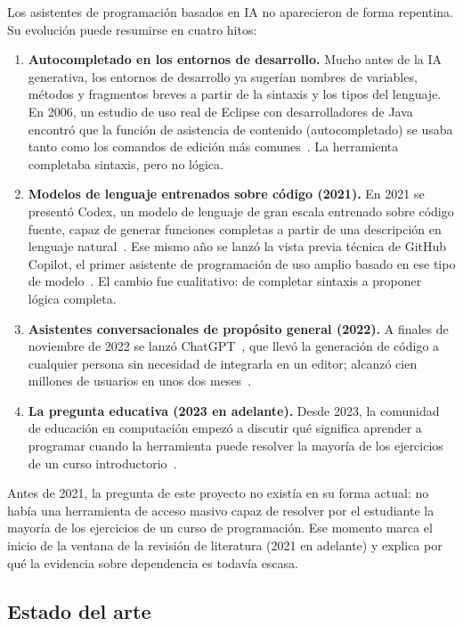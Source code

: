 \documentclass[12pt,letterpaper]{article}
\numberwithin{table}{section}
\numberwithin{figure}{section}
\begin{document}
Los asistentes de programación basados en IA no aparecieron de forma repentina. Su evolución puede resumirse en cuatro hitos:

\begin{enumerate}
  \item \textbf{Autocompletado en los entornos de desarrollo.} Mucho antes de la IA generativa, los entornos de desarrollo ya sugerían nombres de variables, métodos y fragmentos breves a partir de la sintaxis y los tipos del lenguaje. En 2006, un estudio de uso real de Eclipse con desarrolladores de Java encontró que la función de asistencia de contenido (autocompletado) se usaba tanto como los comandos de edición más comunes~\cite{murphy2006eclipse}. La herramienta completaba sintaxis, pero no lógica.
  \item \textbf{Modelos de lenguaje entrenados sobre código (2021).} En 2021 se presentó Codex, un modelo de lenguaje de gran escala entrenado sobre código fuente, capaz de generar funciones completas a partir de una descripción en lenguaje natural~\cite{chen2021evaluating}. Ese mismo año se lanzó la vista previa técnica de GitHub Copilot, el primer asistente de programación de uso amplio basado en ese tipo de modelo~\cite{friedman2021copilot}. El cambio fue cualitativo: de completar sintaxis a proponer lógica completa.
  \item \textbf{Asistentes conversacionales de propósito general (2022).} A finales de noviembre de 2022 se lanzó ChatGPT~\cite{openai2022chatgpt}, que llevó la generación de código a cualquier persona sin necesidad de integrarla en un editor; alcanzó cien millones de usuarios en unos dos meses~\cite{zhang2024dependency}.
  \item \textbf{La pregunta educativa (2023 en adelante).} Desde 2023, la comunidad de educación en computación empezó a discutir qué significa aprender a programar cuando la herramienta puede resolver la mayoría de los ejercicios de un curso introductorio~\cite{becker2023programming}.
\end{enumerate}

Antes de 2021, la pregunta de este proyecto no existía en su forma actual: no había una herramienta de acceso masivo capaz de resolver por el estudiante la mayoría de los ejercicios de un curso de programación. Ese momento marca el inicio de la ventana de la revisión de literatura (2021 en adelante) y explica por qué la evidencia sobre dependencia es todavía escasa.

\subsection{Estado del arte}
\end{document}
